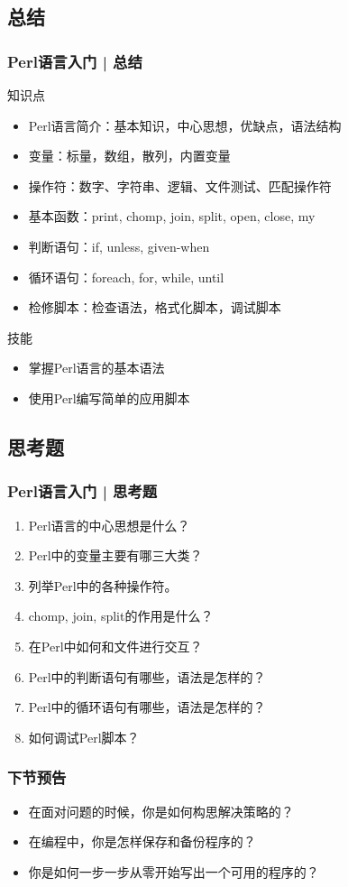 \subsection{总结}
\begin{frame}
  \frametitle{Perl语言入门 | 总结}
  \begin{block}{知识点}
    \begin{itemize}
      \item Perl语言简介：基本知识，中心思想，优缺点，语法结构
      \item 变量：标量，数组，散列，内置变量
      \item 操作符：数字、字符串、逻辑、文件测试、匹配操作符
      \item 基本函数：print, chomp, join, split, open, close, my
      \item 判断语句：if, unless, given-when
      \item 循环语句：foreach, for, while, until
      \item 检修脚本：检查语法，格式化脚本，调试脚本
    \end{itemize}
  \end{block}
  \begin{block}{技能}
    \begin{itemize}
      \item 掌握Perl语言的基本语法
      \item 使用Perl编写简单的应用脚本
    \end{itemize}
  \end{block}
\end{frame}

\subsection{思考题}
\begin{frame}
  \frametitle{Perl语言入门 | 思考题}
  \begin{enumerate}
    \item Perl语言的中心思想是什么？
    \item Perl中的变量主要有哪三大类？
    \item 列举Perl中的各种操作符。
    \item chomp, join, split的作用是什么？
    \item 在Perl中如何和文件进行交互？
    \item Perl中的判断语句有哪些，语法是怎样的？
    \item Perl中的循环语句有哪些，语法是怎样的？
    \item 如何调试Perl脚本？
  \end{enumerate}
\end{frame}

\begin{frame}
  \frametitle{下节预告}
  \begin{itemize}
    \item 在面对问题的时候，你是如何构思解决策略的？
    \item 在编程中，你是怎样保存和备份程序的？
    \item 你是如何一步一步从零开始写出一个可用的程序的？
  \end{itemize}
\end{frame}



